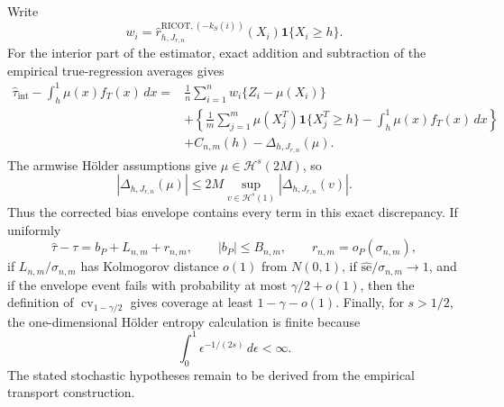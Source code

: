 Write
\[
w_i=\widehat r^{\mathrm{RICOT},(-k_S(i))}_{h,J_{r,n}}(X_i)\mathbf 1\{X_i\ge h\}.
\]
For the interior part of the estimator, exact addition and subtraction of the empirical true-regression averages gives
\[
\begin{aligned}
\widehat\tau_{\mathrm{int}}-\int_h^1\mu(x)f_T(x)\,dx
={}&\frac1n\sum_{i=1}^nw_i\{Z_i-\mu(X_i)\}\\
&+\left\{\frac1m\sum_{j=1}^m\mu(X_j^T)\mathbf 1\{X_j^T\ge h\}-\int_h^1\mu(x)f_T(x)\,dx\right\}\\
&+C_{n,m}(h)-\Delta_{h,J_{r,n}}(\mu).
\end{aligned}
\]
The armwise Hölder assumptions give \(\mu\in\mathcal H^s(2M)\), so
\[
|\Delta_{h,J_{r,n}}(\mu)|\le2M\sup_{v\in\mathcal H^s(1)}|\Delta_{h,J_{r,n}}(v)|.
\]
Thus the corrected bias envelope contains every term in this exact discrepancy. If uniformly
\[
\widehat\tau-\tau=b_P+L_{n,m}+r_{n,m},
\qquad
|b_P|\le B_{n,m},
\qquad
r_{n,m}=o_P(\sigma_{n,m}),
\]
if \(L_{n,m}/\sigma_{n,m}\) has Kolmogorov distance \(o(1)\) from \(N(0,1)\), if \(\widehat{\mathrm{se}}/\sigma_{n,m}\to1\), and if the envelope event fails with probability at most \(\gamma/2+o(1)\), then the definition of \(\operatorname{cv}_{1-\gamma/2}\) gives coverage at least \(1-\gamma-o(1)\). Finally, for \(s>1/2\), the one-dimensional Hölder entropy calculation is finite because
\[
\int_0^1\epsilon^{-1/(2s)}\,d\epsilon<\infty.
\]
The stated stochastic hypotheses remain to be derived from the empirical transport construction.